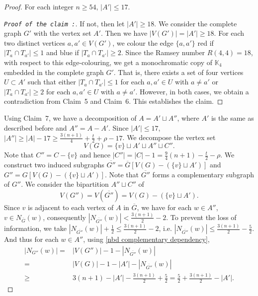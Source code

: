 \documentclass[reqno,10pt]{amsart}
\theoremstyle{definition}
\begin{document}
\begin{proof}
 For each integer $n\geq54$, $|A'|\leq 17$.
\begin{proof}[\tt{Proof of the claim} :]\renewcommand{\qedsymbol}{}
If not, then let $|A'|\geq 18$. We consider the complete graph $G'$ with the vertex set $A'$. Then we have $|V(G')|=|A'|\geq 18$. For each two distinct vertices $a, a'\in V(G')$, we colour the edge $\{a,a'\}$ red if $|T_{a}\cap T_{a'}|\leq1$ and blue if $|T_{a}\cap T_{a'}|\geq2$. Since the Ramsey number $R(4,4)=18$, with respect to this edge-colouring, we get a monochromatic copy of $\mathbb{K}_{4}$ embedded in the complete graph $G'$. That is, there exists a set of four vertices $U\subset A'$ such that either $|T_{a}\cap T_{a'}|\leq1$ for each $a,a'\in U$ with $a\neq a'$ or $|T_{a}\cap T_{a'}|\geq2$ for each $a,a'\in U$ with $a\neq a'$. However, in both cases, we obtain a contradiction from Claim~5 and Claim~6. This establishes the claim.
\end{proof}
 Using Claim~7, we have a decomposition of $A=A'\sqcup A''$, where $A'$ is the same as described before and $A''=A-A'$. Since $|A'|\leq17$, $|A''|\geq |A|-17\geq \frac{3(n+1)}{4}+\frac{t}{2}+\rho-17$. We decompose the vertex set 
\begin{equation*}
V(G)=\{v\}\sqcup A'\sqcup A''\sqcup C''.     
\end{equation*}
Note that $C''=C-\{v\}$ and hence $|C''|=|C|-1= \frac{9}{4}(n+1)-\frac{t}{2}-\rho$. We construct two induced subgraphs $\overline{G''}=\overline{G}[V(G)-(\{v\}\sqcup A')]$ and $G''=G[V(G)-(\{v\}\sqcup A')]$. Note that $\overline{G''}$ forms a complementary subgraph of $G''$.  We consider the bipartition $A''\sqcup C''$ of 
\begin{equation*}
    V(G'')=V(\overline{G''})=V(G)-(\{v\}\sqcup A').
\end{equation*}
Since $v$ is adjacent to each vertex of $A$ in $\overline{G}$, we have for each $w\in A''$, $v\in N_{\overline{G}}(w)$, consequently $|N_{\overline{G''}}(w)|<\frac{3(n+1)}{2}-2$. To prevent the loss of information, we take $|N_{\overline{G''}}(w)|+\frac{1}{2}\leq\frac{3(n+1)}{2}-2$, i.e. $|N_{\overline{G''}}(w)|\leq\frac{3(n+1)}{2}-\frac{5}{2}$. And thus for each $w\in A''$, using \eqref{nbd complementary dependency},
\begin{align*}
|N_{G''}(w)|=&|V(G'')|-1-|N_{\overline{G''}}(w)|\\
 =&|V(G)|-1-|A'|-|N_{\overline{G''}}(w)|\\
 \geq&3(n+1)-|A'|-\frac{3(n+1)}{2}+\frac{5}{2}=\frac{5}{2}+\frac{3(n+1)}{2}-|A'|.
\end{align*}

\end{proof}
\end{document}

